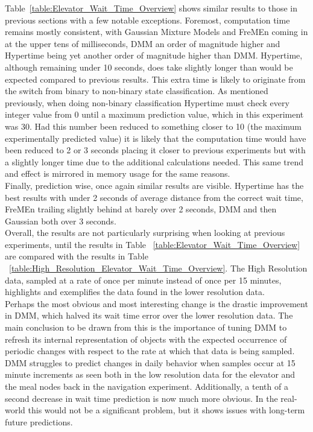 Table~\ref{table:Elevator_Wait_Time_Overview} shows similar results to those
in previous sections with a few notable exceptions. Foremost, computation time
remains mostly consistent, with Gaussian Mixture Models and FreMEn coming in at
the upper tens of milliseconds, DMM an order of magnitude higher and
Hypertime being yet another order of magnitude higher than DMM. Hypertime,
although remaining under 10 seconds, does take slightly longer than would
be expected compared to previous results. This extra time is likely to originate
from the switch from binary to non-binary state classification. As mentioned previously,
when doing non-binary classification Hypertime must check every integer value
from 0 until a maximum prediction value, which in this experiment was 30. Had this
number been reduced to something closer to 10 (the maximum experimentally
predicted value) it is likely that the computation time would have been
reduced to 2 or 3 seconds placing it closer to previous experiments but with a
slightly longer time due to the additional calculations needed. This same
trend and effect is mirrored in memory usage for the same reasons. \\

Finally, prediction wise, once again similar results are visible. Hypertime
has the best results with under 2 seconds of average distance from the correct
wait time, FreMEn trailing slightly behind at barely over 2 seconds, DMM and
then Gaussian both over 3 seconds. \\

Overall, the results are not particularly surprising when looking at previous
experiments, until the results in Table
~\ref{table:Elevator_Wait_Time_Overview} are compared with the results in Table
~\ref{table:High_Resolution_Elevator_Wait_Time_Overview}. The High Resolution
data, sampled at a rate of once per minute instead of once per 15 minutes,
highlights and exemplifies the data found in the lower resolution data. \\

Perhaps the most obvious and most interesting change is the drastic improvement
in DMM, which halved its wait time error over the lower resolution data.
The main conclusion to be drawn from this is the importance of tuning DMM
to refresh its internal representation of objects with the expected occurrence
of periodic changes with respect to the rate at which that data is being
sampled. DMM struggles to predict changes in daily behavior when samples
occur at 15 minute increments as seen both in the low resolution data for the
elevator and the meal nodes back in the navigation experiment.
Additionally, a tenth of a second decrease in wait time prediction is now much more obvious.
In the real-world this would not be a significant problem,
but it shows issues with long-term future predictions. \\

